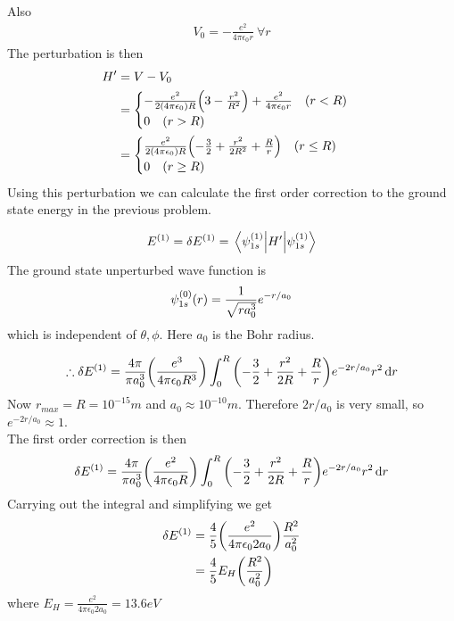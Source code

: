 \begin{enumerate}[label=Problem.\arabic*,start=1]
			Also
			\begin{align*}
				V_0 = - \frac{e^2}{4 \pi \epsilon_0 r} \ \forall r
			\end{align*}
			The perturbation is then
			\begin{align*}
				H^\prime 
				&= V - V_0 \\
				&= \begin{cases}
				- \frac{e^2}{2 \qty(4 \pi \epsilon_0) R} \qty(3 - \frac{r^2}{R^2}) + \frac{e^2}{4 \pi \epsilon_0 r} \quad (r < R) \\ 0 \quad (r > R)
				\end{cases}\\
				&= \begin{cases}
				\frac{e^2}{2 \qty(4 \pi \epsilon_0) R} \qty(-\frac{3}{2} + \frac{r^2}{2 R^2}  + \frac{R}{r}) \quad (r \leq R)
				\\ 0 \quad (r \geq R)
				\end{cases}
			\end{align*}
			Using this perturbation we can calculate the first order correction to the ground state energy in the previous problem.
			
			\begin{align*}
				E^{(1)} = \delta E^{(1)} = \expval{H^\prime}{\psi_{1 s}^{(1)}}
			\end{align*}
			The ground state unperturbed wave function is
			\begin{align*}
				\psi_{1 s}^{(0)}\qty(r) = \frac{1}{\sqrt{r a_0^3}} e^{-r/a_0}
			\end{align*}
			which is independent of $\theta, \phi$. Here $a_0$ is the Bohr radius.
			
			\begin{align*}
				\therefore \delta E^{(1)} = \frac{4 \pi}{\pi a_0^3} \qty(\frac{e^3}{4 \pi \epsilon_0 R^3}) \int_{0}^{R} \qty(-\frac{3}{2} + \frac{r^2}{2 R}  +  \frac{R}{r}) e^{-2 r / a_0} r^2 \dd{r}
			\end{align*}
			Now $r_{max} = R = 10^{-15} m$ and $a_0 \approx 10^{-10} m$. Therefore $2 r  / a_0$ is very small, so $e^{-2 r / a_0} \approx 1$.\\
			
			The first order correction is then
			\begin{equation*}
				\delta E^{(1)} = \frac{4 \pi}{\pi a_0^3} \qty(\frac{e^2}{4\pi \epsilon_0 R}) \int_{0}^{R} \qty(-\frac{3}{2} + \frac{r^2}{2 R}  +  \frac{R}{r}) e^{-2 r / a_0} r^2 \dd{r}
			\end{equation*}
			Carrying out the integral and simplifying we get
			\begin{align*}
				\delta E^{(1)} 
				&= \frac{4}{5} \qty(\frac{e^2}{4\pi \epsilon_0 2 a_0}) \frac{R^2}{a_0^2} \\
				&= \frac{4}{5} E_H \qty(\frac{R^2}{a_0^2})
			\end{align*}
			where $E_H =\frac{e^2}{4\pi \epsilon_0 2 a_0}= 13.6 eV$
		

\end{enumerate}
